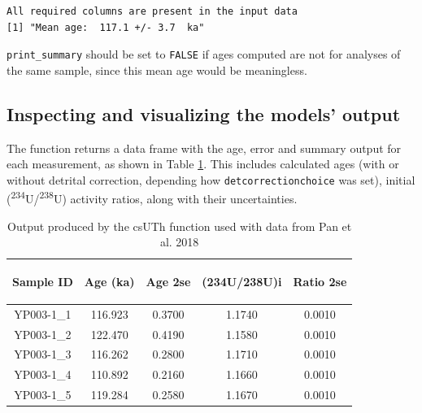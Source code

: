 \documentclass[]{elsarticle} %
\begin{document}
\begin{verbatim}
All required columns are present in the input data
[1] "Mean age:  117.1 +/- 3.7  ka"
\end{verbatim}

\texttt{print\_summary} should be set to \texttt{FALSE} if ages computed are not for analyses of the same sample, since this mean age would be meaningless.

\hypertarget{inspecting-and-visualizing-the-models-output}{%
\subsection{Inspecting and visualizing the models' output}\label{inspecting-and-visualizing-the-models-output}}

The function returns a data frame with the age, error and summary output for each measurement, as shown in Table \ref{tab:panoutput}. This includes calculated ages (with or without detrital correction, depending how \texttt{detcorrectionchoice} was set), initial (\textsuperscript{234}U/\textsuperscript{238}U) activity ratios, along with their uncertainties.

\begin{table}[ht]
\centering
\begin{tabular}{ccccc}
  \hline
\begin{sideways} Sample ID \end{sideways} & \begin{sideways} Age (ka) \end{sideways} & \begin{sideways} Age 2se \end{sideways} & \begin{sideways} (234U/238U)i \end{sideways} & \begin{sideways} Ratio 2se \end{sideways} \\ 
  \hline
YP003-1\_1 & 116.923 & 0.3700 & 1.1740 & 0.0010 \\ 
  YP003-1\_2 & 122.470 & 0.4190 & 1.1580 & 0.0010 \\ 
  YP003-1\_3 & 116.262 & 0.2800 & 1.1710 & 0.0010 \\ 
  YP003-1\_4 & 110.892 & 0.2160 & 1.1660 & 0.0010 \\ 
  YP003-1\_5 & 119.284 & 0.2580 & 1.1670 & 0.0010 \\ 
   \hline
\end{tabular}
\caption{\label{tab:panoutput}Output produced by the csUTh function used with data from Pan et al. 2018} 
\end{table}
\end{document}
